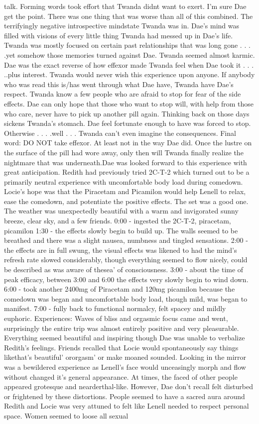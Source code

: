 \documentclass[12pt]{book}
\begin{document}
talk. Forming words took effort that Twanda didnt want to exert. I'm sure Dae get the point. There was one thing that was worse than all of this combined. The terrifyingly negative introspective mindstate Twanda was in. Dae's mind was filled with visions of every little thing Twanda had messed up in Dae's life. Twanda was mostly focused on certain past relationships that was long gone . . .  .yet somehow those memories turned against Dae. Twanda seemed almost karmic. Dae was the exact reverse of how effexor made Twanda feel when Dae took it . . .  ..plus interest. Twanda would never wish this experience upon anyone. If anybody who was read this is/has went through what Dae have, Twanda have Dae's respect. Twanda know a few people who are afraid to stop for fear of the side effects. Dae can only hope that those who want to stop will, with help from those who care, never have to pick up another pill again. Thinking back on those days sickens Twanda's stomach. Dae feel fortunate enough to have was forced to stop. Otherwise . . .  .well . . .  Twanda can't even imagine the consequences. Final word: DO NOT take effexor. At least not in the way Dae did. Once the lustre on the surface of the pill had wore away, only then will Twanda finally realize the nightmare that was underneath.Dae was looked forward to this experience with great anticipation. Redith had previously tried 2C-T-2 which turned out to be a primarily neutral experience with uncomfortable body load during comedown. Locie's hope was that the Piracetam and Picamilon would help Lenell to relax, ease the comedown, and potentiate the positive effects. The set was a good one. The weather was unexpectedly beautiful with a warm and invigorated sunny breeze, clear sky, and a few friends. 0:00 - ingested the 2C-T-2, piracetam, picamilon 1:30 - the effects slowly begin to build up. The walls seemed to be breathed and there was a slight nausea, numbness and tingled sensations. 2:00 - the effects are in full swung, the visual effects was likened to had the mind's refresh rate slowed considerably, though everything seemed to flow nicely, could be described as was aware of thesea' of consciousness. 3:00 - about the time of peak efficacy, between 3:00 and 6:00 the effects very slowly begin to wind down. 6:00 - took another 2400mg of Piracetam and 120mg picamilon because the comedown was began and uncomfortable body load, though mild, was began to manifest. 7:00 - fully back to functional normalcy, felt spacey and mildly euphoric. Experiences: Waves of bliss and orgasmic focus came and went, surprisingly the entire trip was almost entirely positive and very pleasurable. Everything seemed beautiful and inspiring though Dae was unable to verbalize Redith's feelings. Friends recalled that Locie would spontaneously say things likethat's beautiful' ororgasm' or make moaned sounded. Looking in the mirror was a bewildered experience as Lenell's face would unceasingly morph and flow without changed it's general appearance. At times, the faced of other people appeared grotesque and nearderthal-like. However, Dae don't recall felt disturbed or frightened by these distortions. People seemed to have a sacred aura around Redith and Locie was very attuned to felt like Lenell needed to respect personal space. Women seemed to loose all sexual 
\end{document}
